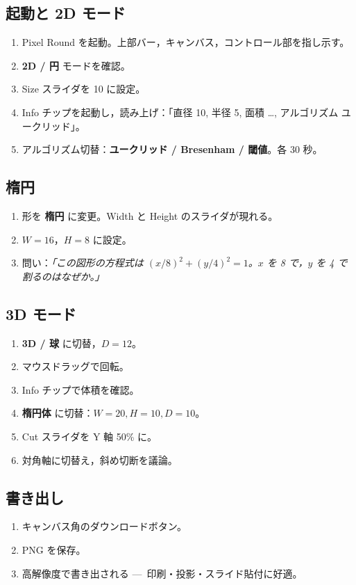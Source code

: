 \documentclass[12pt,a4paper]{scrartcl}
\newcommand{\acc}[1]{\textcolor{accent}{\textbf{#1}}}
\begin{document}
\subsection{起動と 2D モード}
\begin{enumerate}[leftmargin=1.5em,itemsep=0.15em,topsep=0.3em]
  \item Pixel Round を起動。上部バー，キャンバス，コントロール部を指し示す。
  \item \acc{2D / 円} モードを確認。
  \item Size スライダを 10 に設定。
  \item Info チップを起動し，読み上げ：「直径 10, 半径 5, 面積 …, アルゴリズム ユークリッド」。
  \item アルゴリズム切替：\acc{ユークリッド / Bresenham / 閾値}。各 30 秒。
\end{enumerate}

\subsection{楕円}
\begin{enumerate}[leftmargin=1.5em,itemsep=0.15em,topsep=0.3em]
  \item 形を \acc{楕円} に変更。Width と Height のスライダが現れる。
  \item $W = 16$，$H = 8$ に設定。
  \item 問い：\emph{「この図形の方程式は $(x/8)^2 + (y/4)^2 = 1$。$x$ を 8 で，$y$ を 4 で割るのはなぜか。」}
\end{enumerate}

\subsection{3D モード}
\begin{enumerate}[leftmargin=1.5em,itemsep=0.15em,topsep=0.3em]
  \item \acc{3D / 球} に切替，$D = 12$。
  \item マウスドラッグで回転。
  \item Info チップで体積を確認。
  \item \acc{楕円体} に切替：$W = 20, H = 10, D = 10$。
  \item Cut スライダを Y 軸 50\% に。
  \item 対角軸に切替え，斜め切断を議論。
\end{enumerate}

\subsection{書き出し}
\begin{enumerate}[leftmargin=1.5em,itemsep=0.15em,topsep=0.3em]
  \item キャンバス角のダウンロードボタン。
  \item PNG を保存。
  \item 高解像度で書き出される ---\, 印刷・投影・スライド貼付に好適。
\end{enumerate}
\end{document}
